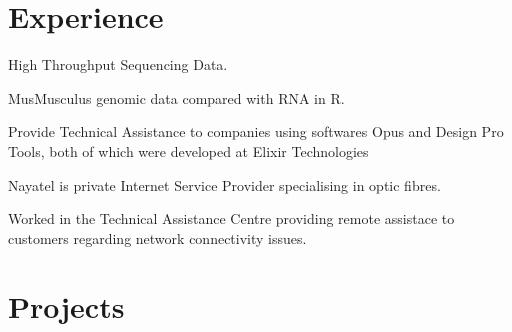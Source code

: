 \documentclass[letterpaper]{deedy-resume} %
\begin{document}
\begin{minipage}[t]{0.66\textwidth} %


\section{Experience}


\vspace{\topsep} %
\begin{tightitemize}
\item High Throughput Sequencing Data.
\item MusMusculus genomic data compared with RNA in R.
\end{tightitemize}

\sectionspace %


\begin{tightitemize}
\item Provide Technical Assistance to companies using softwares Opus and Design Pro Tools,
both of which were developed at Elixir Technologies
\end{tightitemize}

\sectionspace %



\begin{tightitemize}
\item Nayatel is private Internet Service Provider specialising in optic fibres.
\item Worked in the Technical Assistance Centre providing remote assistace to customers
regarding network connectivity issues.
\end{tightitemize}

\sectionspace %
\section{Projects}


\end{minipage}
\end{document}
